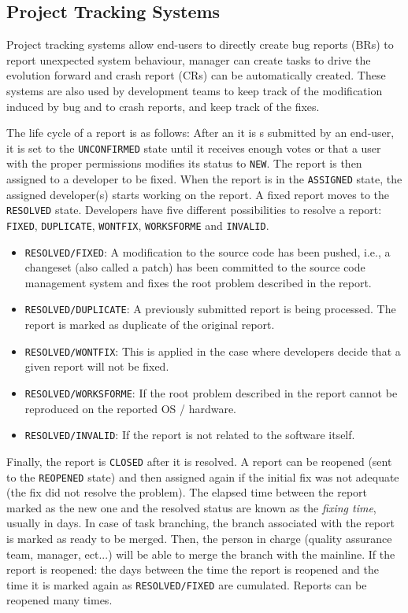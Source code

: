\subsection{Project Tracking Systems\label{sec:issue-tracking}}

Project tracking systems allow end-users to directly create bug reports (BRs) to report unexpected system behaviour,
manager can create tasks to drive the evolution forward and crash report (CRs) can be automatically created.
These systems are also used by development teams to keep track of the modification induced by bug and to crash reports, and keep track of the fixes.

The life cycle of a report is as follows: After an  it is s submitted by an end-user, it is set to the {\tt UNCONFIRMED} state until it receives enough votes or that a user with the proper permissions modifies its status to {\tt NEW}.
The report is then assigned to a developer to be fixed.
When the report is in the {\tt ASSIGNED} state, the assigned developer(s) starts working on the report.
A fixed report moves to the {\tt RESOLVED} state. Developers have five different possibilities to resolve a report: {\tt FIXED}, {\tt DUPLICATE}, {\tt WONTFIX}, {\tt WORKSFORME} and {\tt INVALID}.

\begin{itemize}
	\item {\tt RESOLVED/FIXED}: A modification to the source code has been pushed, i.e., a changeset (also called a patch) has been committed to the source code management system and fixes the root problem described in the report.
	\item {\tt RESOLVED/DUPLICATE}: A previously submitted report is being processed. The report is marked as duplicate of the original report.
	\item {\tt RESOLVED/WONTFIX}: This is applied in the case where developers decide that a given report will not be fixed.
	\item {\tt RESOLVED/WORKSFORME}: If the root problem described in the report cannot be reproduced on the reported OS / hardware.
	\item {\tt RESOLVED/INVALID}: If the report is not related to the software itself.
\end{itemize}

Finally, the report is {\tt CLOSED} after it is resolved.
A report can be reopened (sent to the {\tt REOPENED} state) and then assigned again if the initial fix was not adequate (the fix did not resolve the problem).
The elapsed time between the report marked as the new one and the resolved status are known as the {\it fixing time}, usually in days.
In case of task branching, the branch associated with the report is marked as ready to be merged.
Then, the person in charge (quality assurance team, manager, ect...) will be able to merge the branch with the mainline.
If the report is reopened: the days between the time the report is reopened and the time it is marked again as {\tt RESOLVED/FIXED} are cumulated.
Reports can be reopened many times.


